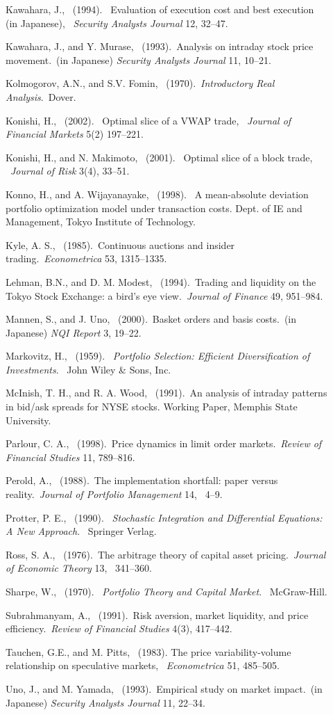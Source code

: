 \begin{description}
 \item[] Kawahara, J., ~(1994).  ~Evaluation of execution cost and best execution
 (in Japanese), ~{\it Security Analysts Journal} 12, 32--47.
 \item[] Kawahara, J., and Y. Murase, ~(1993).~Analysis on intraday stock price
 movement.~(in Japanese) {\it Security Analysts Journal} 11, 10--21.
 \item[] Kolmogorov, A.N., and S.V. Fomin, ~(1970).~{\it Introductory Real Analysis}.~Dover.
 \item[] Konishi, H., ~(2002). ~Optimal slice of a VWAP trade, ~{\it Journal of Financial Markets} 5(2) 197--221.
 \item[] Konishi, H., and N. Makimoto, ~(2001). ~Optimal slice of a block trade, ~{\it Journal of Risk} 3(4), 33--51.
 \item[] Konno, H., and A. Wijayanayake,  ~(1998). ~A mean-absolute deviation portfolio optimization model under transaction costs.  Dept. of IE and Management, Tokyo Institute of Technology.
 \item[] Kyle, A. S., ~(1985).~Continuous auctions and insider trading.~{\it  Econometrica} 53, 1315--1335.
 \item[] Lehman, B.N., and D. M. Modest,   ~(1994).~Trading and liquidity on the Tokyo Stock Exchange: a bird's eye view.~{\it  Journal of Finance} 49, 951--984.
 \item[] Mannen, S., and J. Uno, ~(2000).~Basket orders and basis costs.~(in Japanese) {\it NQI Report} 3, 19--22.
 \item[] Markovitz, H., ~(1959). ~{\it Portfolio Selection: Efficient Diversification of Investments}. ~John Wiley \& Sons, Inc.
 \item[] McInish, T. H., and R. A. Wood,  ~(1991).~An analysis of intraday patterns in bid/ask spreads for NYSE stocks. Working Paper, Memphis State University.
 \item[] Parlour, C. A., ~(1998).~Price dynamics in limit order markets.~{\it Review of Financial Studies} 11, 789--816.
 \item[] Perold, A., ~(1988).~The implementation shortfall: paper versus reality.~{\it Journal of Portfolio Management} 14, ~4--9.
 \item[] Protter, P. E., ~(1990). ~{\it Stochastic Integration and Differential Equations: A New Approach}. ~Springer Verlag.
 \item[] Ross, S. A., ~(1976).~The arbitrage theory of capital asset pricing.~{\it Journal of Economic Theory} 13, ~341--360.
 \item[] Sharpe, W., ~(1970). ~{\it Portfolio Theory and Capital Market}. ~McGraw-Hill.
 \item[] Subrahmanyam, A., ~(1991).~Risk aversion, market liquidity, and price efficiency.~{\it Review of Financial Studies} 4(3), 417--442. 
 \item[] Tauchen, G.E., and M. Pitts, ~(1983). The price variability-volume relationship on speculative markets, ~{\it Econometrica} 51, 485--505.
 \item[] Uno, J., and M. Yamada, ~(1993).~Empirical study on market impact.~(in Japanese) {\it Security Analysts Journal} 11, 22--34.
\end{description}
